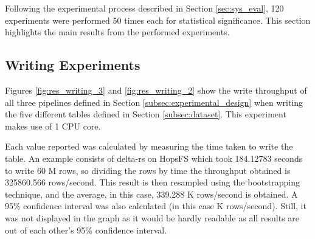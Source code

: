 Following the experimental process described in Section \ref{sec:sys_eval}, 120 experiments were performed 50 times each for statistical significance. This section highlights the main results from the performed experiments.

\subsection{Writing Experiments}

Figures \ref{fig:res_writing_3} and \ref{fig:res_writing_2} show the write throughput of all three pipelines defined in Section \ref{subsec:experimental_design} when writing the five different tables defined in Section \ref{subsec:dataset}. This experiment makes use of 1 \gls{CPU} core. 

Each value reported was calculated by measuring the time taken to write the table. An example consists of delta-rs on \gls{HopsFS} which took 184.12783 seconds to write 60 M rows, so dividing the rows by time the throughput obtained is 325860.566 rows/second. This result is then resampled using the bootstrapping technique, and the average, in this case, 339.288 K rows/second is obtained. A 95\% confidence interval was also calculated (in this case  K rows/second). Still, it was not displayed in the graph as it would be hardly readable as all results are out of each other's 95\% confidence interval.


